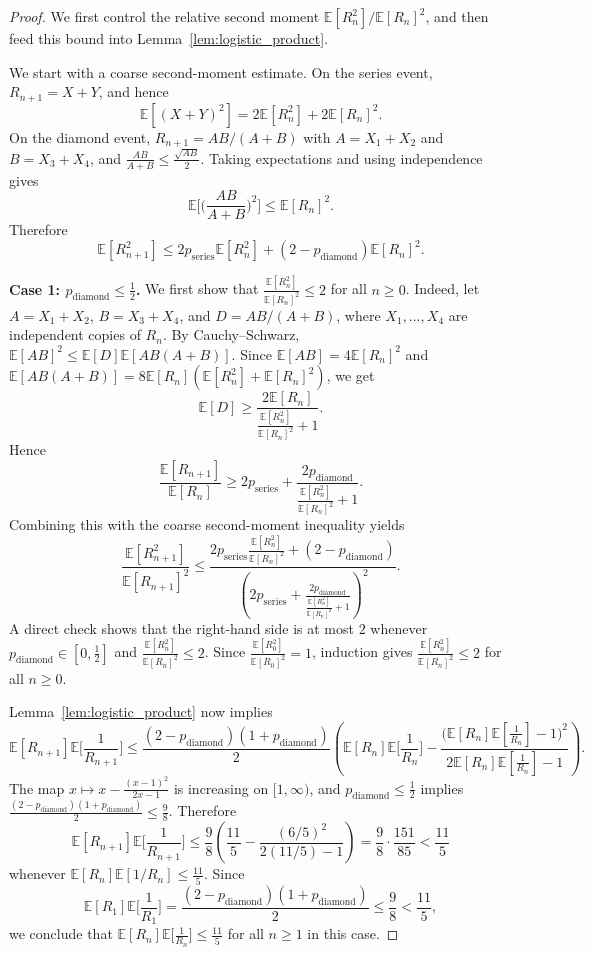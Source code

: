 \documentclass{article}
\theoremstyle{plain}
\theoremstyle{definition}
\begin{document}
\begin{proof}
 
We first control the relative second moment $\mathbb E[R_n^2]/\mathbb E[R_n]^2$, and then feed this bound into Lemma~\ref{lem:logistic_product}.

We start with a coarse second-moment estimate.
On the series event, $R_{n+1}=X+Y$, and hence
\[
\mathbb E[(X+Y)^2]=2\mathbb E[R_n^2]+2\mathbb E[R_n]^2.
\]
On the diamond event, $R_{n+1}=AB/(A+B)$ with $A=X_1+X_2$ and $B=X_3+X_4$, and
$
\frac{AB}{A+B}\le \frac{\sqrt{AB}}{2}.
$
Taking expectations and using independence gives
\[
\mathbb E\Big[\Big(\frac{AB}{A+B}\Big)^2\Big]\le \mathbb E[R_n]^2.
\]
Therefore
\[
\mathbb E[R_{n+1}^2]
\le
2p_{\mathrm{series}}\mathbb E[R_n^2]+(2-p_{\mathrm{diamond}})\mathbb E[R_n]^2.
\]

\textbf{Case 1: $p_{\mathrm{diamond}}\le \frac{1}{2}$.}
We first show that
$
\frac{\mathbb E[R_n^2]}{\mathbb E[R_n]^2}\le 2
$
for all $n\ge 0$.
Indeed, let $A=X_1+X_2$, $B=X_3+X_4$, and $D=AB/(A+B)$, where $X_1,\dots,X_4$ are independent copies of $R_n$.
By Cauchy--Schwarz, $\mathbb E[AB]^2\le \mathbb E[D]\mathbb E[AB(A+B)]$.
Since $\mathbb E[AB]=4\mathbb E[R_n]^2$ and $\mathbb E[AB(A+B)]=8\mathbb E[R_n](\mathbb E[R_n^2]+\mathbb E[R_n]^2)$, we get
\[
\mathbb E[D]\ge \frac{2\mathbb E[R_n]}{\frac{\mathbb E[R_n^2]}{\mathbb E[R_n]^2}+1}.
\]
Hence
\[
\frac{\mathbb E[R_{n+1}]}{\mathbb E[R_n]}
\ge
2p_{\mathrm{series}}+\frac{2p_{\mathrm{diamond}}}{\frac{\mathbb E[R_n^2]}{\mathbb E[R_n]^2}+1}.
\]
Combining this with the coarse second-moment inequality yields
\[
\frac{\mathbb E[R_{n+1}^2]}{\mathbb E[R_{n+1}]^2}
\le
\frac{
2p_{\mathrm{series}}\frac{\mathbb E[R_n^2]}{\mathbb E[R_n]^2}+(2-p_{\mathrm{diamond}})
}{
\left(
2p_{\mathrm{series}}+\frac{2p_{\mathrm{diamond}}}{\frac{\mathbb E[R_n^2]}{\mathbb E[R_n]^2}+1}
\right)^2
}.
\]
A direct check shows that the right-hand side is at most $2$ whenever $p_{\mathrm{diamond}}\in[0,\frac{1}{2}]$ and $\frac{\mathbb E[R_n^2]}{\mathbb E[R_n]^2}\le 2$.
Since $\frac{\mathbb E[R_0^2]}{\mathbb E[R_0]^2}=1$, induction gives $\frac{\mathbb E[R_n^2]}{\mathbb E[R_n]^2}\le 2$ for all $n\ge 0$.

Lemma~\ref{lem:logistic_product} now implies
\[
\mathbb E[R_{n+1}]\mathbb E\Big[\frac{1}{R_{n+1}}\Big]
\le
\frac{(2-p_{\mathrm{diamond}})(1+p_{\mathrm{diamond}})}{2}
\left(
\mathbb E[R_n]\mathbb E\Big[\frac{1}{R_n}\Big]
-
\frac{\big(\mathbb E[R_n]\mathbb E[\frac{1}{R_n}]-1\big)^2}{2\mathbb E[R_n]\mathbb E[\frac{1}{R_n}]-1}
\right).
\]
The map $x\mapsto x-\frac{(x-1)^2}{2x-1}$ is increasing on $[1,\infty)$, and $p_{\mathrm{diamond}}\le \frac{1}{2}$ implies $\frac{(2-p_{\mathrm{diamond}})(1+p_{\mathrm{diamond}})}{2}\le \frac{9}{8}$.
Therefore
\[
\mathbb E[R_{n+1}]\mathbb E\Big[\frac{1}{R_{n+1}}\Big]
\le
\frac{9}{8}\left(\frac{11}{5}-\frac{(6/5)^2}{2(11/5)-1}\right)
=
\frac{9}{8}\cdot\frac{151}{85}
<
\frac{11}{5}
\]
whenever $\mathbb E[R_n]\mathbb E[1/R_n]\le \frac{11}{5}$.
Since
\[
\mathbb E[R_1]\mathbb E\Big[\frac{1}{R_1}\Big]
=
\frac{(2-p_{\mathrm{diamond}})(1+p_{\mathrm{diamond}})}{2}
\le
\frac{9}{8}
<
\frac{11}{5},
\]
we conclude that
$
\mathbb E[R_n]\mathbb E\Big[\frac{1}{R_n}\Big]\le \frac{11}{5}
$
for all $n\ge 1$ in this case.





\end{proof}
\end{document}
